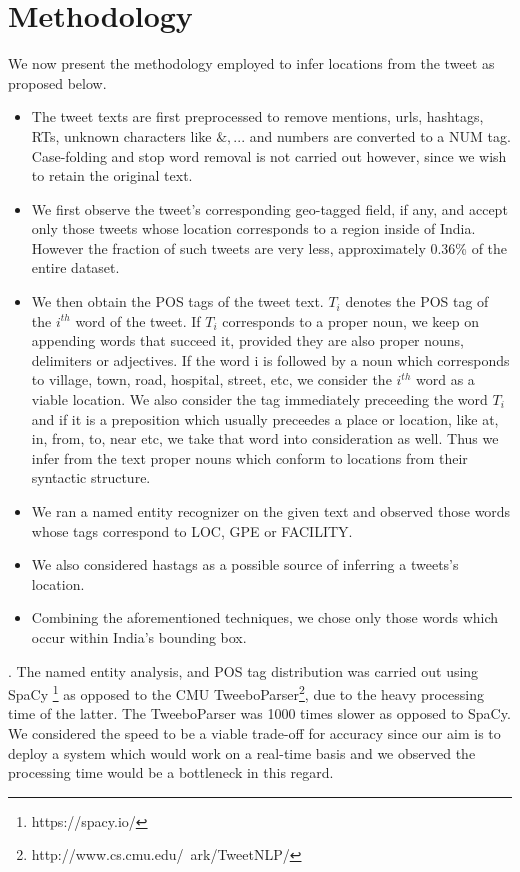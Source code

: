 \documentclass[journal, a4paper]{IEEEtran}
\begin{document}
\section{Methodology}
We now present the methodology employed to infer locations from the tweet as proposed below.
\begin{itemize}
	\item The tweet texts are first preprocessed to remove mentions, urls, hashtags, RTs, unknown characters like \(\&, ...\) and numbers are converted to a NUM tag. Case-folding and stop word removal is not carried out however, since we wish to retain the original text.
	\item We first observe the tweet's corresponding geo-tagged field, if any, and accept only those tweets whose location  corresponds to a region inside of India. However the fraction of such tweets are very less, approximately 0.36\% of the entire dataset.
	
	\item We then obtain the POS tags of the tweet text. $T_{i}$ denotes the POS tag of the $i^{th}$ word of the tweet.  If $T_{i}$ corresponds to a proper noun, we keep on appending words that succeed it, provided they are also proper nouns, delimiters or adjectives. If the word i is followed by a noun which corresponds to village, town, road, hospital, street, etc, we consider the $i^{th}$ word as a viable location. We also consider the tag immediately preceeding the word $T_{i}$ and if it is a preposition which usually preceedes a place or location, like at, in, from, to, near etc, we take that word into consideration as well. Thus we infer from the text proper nouns which conform to locations from their syntactic structure. 
	
	\item We ran a named entity recognizer on the given text and observed those words whose tags correspond to LOC, GPE or FACILITY.
	
	\item We also considered hastags as a possible source of inferring a tweets's location. 
	
	\item Combining the aforementioned techniques, we chose only those words which occur within India's bounding box. 
\end{itemize} . 
The named entity analysis, and POS tag distribution was carried out using SpaCy \footnote{https://spacy.io/} as opposed to the CMU TweeboParser\footnote{http://www.cs.cmu.edu/~ark/TweetNLP/}, due to the heavy processing time of the latter. The TweeboParser was 1000 times slower as opposed to SpaCy. We considered the speed to be a viable trade-off for accuracy since our aim is to deploy a system which would work on a real-time basis and we observed the processing time would be a bottleneck in this regard.
\end{document}
